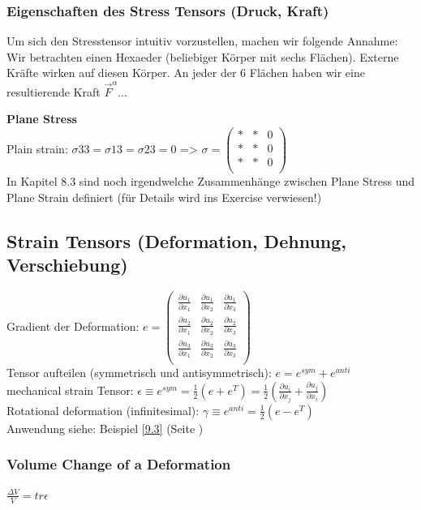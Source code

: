 \documentclass[a4paper]{scrartcl}
\begin{document}
\subsubsection{Eigenschaften des Stress Tensors (Druck, Kraft)}
Um sich den Stresstensor intuitiv vorzustellen, machen wir folgende Annahme:
Wir betrachten einen Hexaeder (beliebiger Körper mit sechs Flächen). Externe
Kräfte wirken auf diesen Körper. An jeder der 6 Flächen haben wir eine
resultierende Kraft $\vec F^\alpha$...

\textbf{Plane Stress}\\
Plain strain: $\sigma{33} = \sigma{13} = \sigma{23}= 0$ => $\sigma =
\begin{pmatrix}
* & * & 0\\
* & * & 0\\
* & * & 0\\
\end{pmatrix} $\\
In Kapitel 8.3 sind noch irgendwelche Zusammenhänge zwischen Plane Stress und
Plane Strain definiert (für Details wird ins Exercise verwiesen!)

\subsection{Strain Tensors (Deformation, Dehnung, Verschiebung)}
Gradient der Deformation: $e = \begin{pmatrix}
\frac{\partial u_1}{\partial x_1} & \frac{\partial u_1}{\partial x_2} &
\frac{\partial u_1}{\partial x_3}\\
\frac{\partial u_2}{\partial x_1} & \frac{\partial u_2}{\partial x_2} &
\frac{\partial u_2}{\partial x_3}\\
\frac{\partial u_3}{\partial x_1} & \frac{\partial u_3}{\partial x_2} &
\frac{\partial u_3}{\partial x_3}\\
\end{pmatrix}$\\
Tensor aufteilen (symmetrisch und antisymmetrisch): $e = e^{sym} + e^{anti}$\\
mechanical strain Tensor: $\epsilon \equiv e^{sym} = \frac{1}{2} (e + e^T) =
\frac{1}{2} (\frac{\partial u_i}{\partial x_j} + \frac{\partial
u_j}{\partial x_i})$\\
Rotational deformation (infinitesimal): $\gamma \equiv e^{anti} = \frac{1}{2} (e
- e^T)$\\
Anwendung siehe: Beispiel \ref{9.3} (Seite \pageref{9.3})

\subsubsection{Volume Change of a Deformation}
$\frac{\Delta V}{V} = tr \epsilon $
\end{document}
